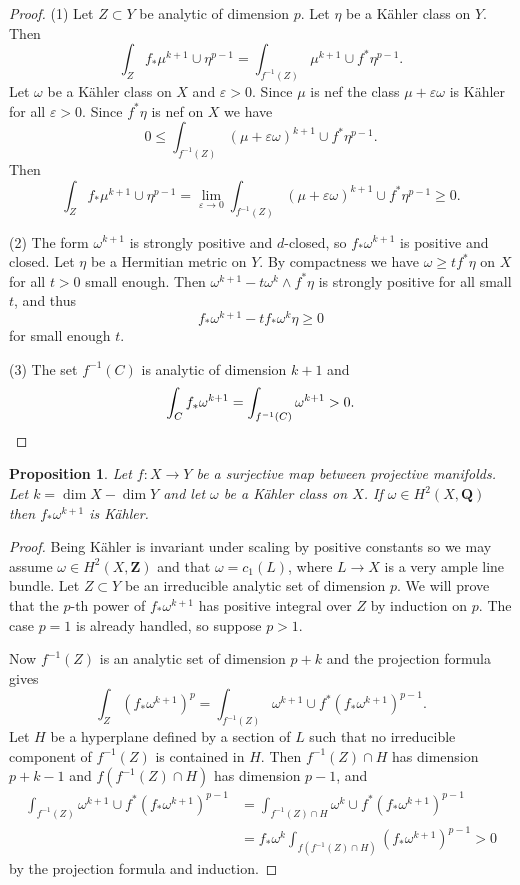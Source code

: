 \documentclass[11pt]{amsart}
\newtheorem{prop}[theo]{Proposition}
\theoremstyle{definition}
\def\eps{\varepsilon}
\def\ZZ{\mathbf{Z}}
\def\QQ{\mathbf{Q}}
\begin{document}
\begin{proof}
(1)
Let $Z \subset Y$ be analytic of dimension $p$.
Let $\eta$ be a K\"ahler class on $Y$.
Then
\[
\int_Z f_*\mu^{k+1} \cup \eta^{p-1}
= \int_{f^{-1}(Z)} \mu^{k+1} \cup f^*\eta^{p-1}.
\]
Let $\omega$ be a K\"ahler class on $X$ and $\eps > 0$.
Since $\mu$ is nef the class $\mu + \eps \omega$ is K\"ahler for all $\eps > 0$.
Since $f^*\eta$ is nef on $X$ we have
\[
0 \leq \int_{f^{-1}(Z)} (\mu + \eps\omega)^{k+1} \cup f^*\eta^{p-1}.
\]
Then
\[
\int_Z f_*\mu^{k+1} \cup \eta^{p-1}
= \lim_{\eps \to 0} \int_{f^{-1}(Z)} (\mu + \eps\omega)^{k+1} \cup f^*\eta^{p-1}
\geq 0.
\]

(2)
The form $\omega^{k+1}$ is strongly positive and $d$-closed, so $f_*\omega^{k+1}$ is positive and closed.
Let $\eta$ be a Hermitian metric on $Y$.
By compactness we have $\omega \geq t f^*\eta$ on $X$ for all $t > 0$ small enough.
Then $\omega^{k+1} - t \omega^k \wedge f^*\eta$ is strongly positive for all small $t$, and thus
\[
f_*\omega^{k+1} - t f_*\omega^k \eta \geq 0
\]
for small enough $t$.

(3)
The set $f^{-1}(C)$ is analytic of dimension $k+1$ and
\[
\int_C f_*\omega^{k+1}
= \int_{f^{-1}(C)} \omega^{k+1} > 0.
\qedhere
\]
\end{proof}

\begin{prop}
Let $f : X \to Y$ be a surjective map between projective manifolds.
Let $k = \dim X - \dim Y$ and let $\omega$ be a K\"ahler class on $X$.
If $\omega \in H^2(X,\QQ)$ then $f_*\omega^{k+1}$ is K\"ahler.
\end{prop}

\begin{proof}
Being K\"ahler is invariant under scaling by positive constants so we may assume $\omega \in H^2(X,\ZZ)$ and that $\omega = c_1(L)$, where $L \to X$ is a very ample line bundle.
Let $Z \subset Y$ be an irreducible analytic set of dimension $p$.
We will prove that the $p$-th power of $f_*\omega^{k+1}$ has positive integral over $Z$ by induction on $p$.
The case $p = 1$ is already handled, so suppose $p > 1$.

Now $f^{-1}(Z)$ is an analytic set of dimension $p+k$ and the projection formula gives
\[
\int_Z (f_*\omega^{k+1})^p
= \int_{f^{-1}(Z)} \omega^{k+1} \cup f^*(f_*\omega^{k+1})^{p-1}.
\]
Let $H$ be a hyperplane defined by a section of $L$ such that no irreducible component of $f^{-1}(Z)$ is contained in $H$.
Then $f^{-1}(Z) \cap H$ has dimension $p+k-1$ and $f(f^{-1}(Z) \cap H)$ has dimension $p-1$, and 
\begin{align*}
\int_{f^{-1}(Z)} \omega^{k+1} \cup f^*(f_*\omega^{k+1})^{p-1}
&= \int_{f^{-1}(Z) \cap H} \omega^{k} \cup f^*(f_*\omega^{k+1})^{p-1}
\\
&= f_*\omega^{k} \int_{f(f^{-1}(Z) \cap H)} (f_*\omega^{k+1})^{p-1}
> 0
\end{align*}
by the projection formula and induction.
\end{proof}
\end{document}
